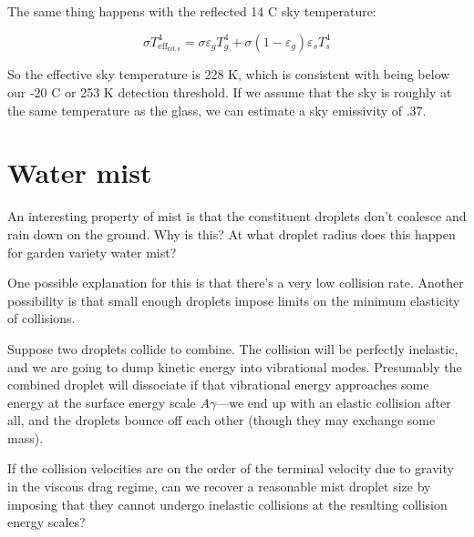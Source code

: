 \documentclass[12pt]{article}
\begin{document}
The same thing happens with the reflected 14 C sky temperature:

\[ \sigma T_{\mathrm{eff_{ref,s}}}^4 = \sigma\varepsilon_gT_g^4+\sigma(1-\varepsilon_g)\varepsilon_s T_s^4
\]

So the effective sky temperature is 228 K, which is consistent with being below our -20 C or 253 K detection threshold. If we assume that the sky is roughly at the same temperature as the glass, we can estimate a sky emissivity of .37.


\section{Water mist}

An interesting property of mist is that the constituent droplets don't coalesce and rain down on the ground. Why is this? At what droplet radius does this happen for garden variety water mist?

One possible explanation for this is that there's a very low collision rate. Another possibility is that small enough droplets impose limits on the minimum elasticity of collisions.

Suppose two droplets collide to combine. The collision will be perfectly inelastic, and we are going to dump kinetic energy into vibrational modes. Presumably the combined droplet will dissociate if that vibrational energy approaches some energy at the surface energy scale \(A\gamma\)---we end up with an elastic collision after all, and the droplets bounce off each other (though they may exchange some mass).

If the collision velocities are on the order of the terminal velocity due to gravity in the viscous drag regime, can we recover a reasonable mist droplet size by imposing that they cannot undergo inelastic collisions at the resulting collision energy scales?
\end{document}
